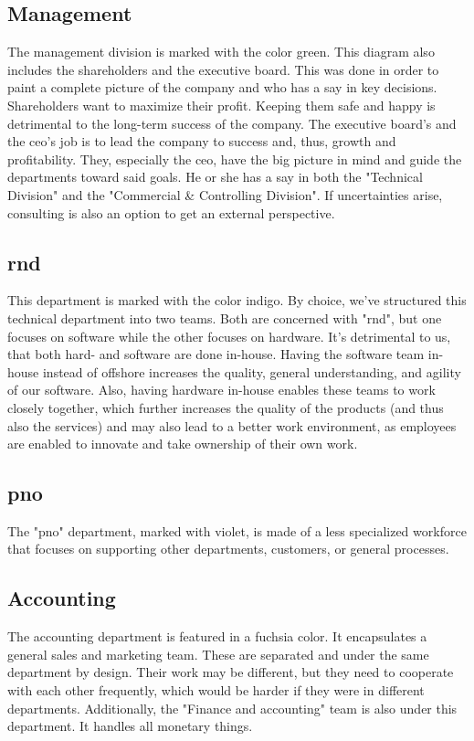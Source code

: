 \subsection{Management}\label{org-management}
The management division is marked with the color green. This diagram also includes the shareholders and the executive board. This was done in order to paint a complete picture of the company and who has a say in key decisions.
\newline
Shareholders want to maximize their profit. Keeping them safe and happy is detrimental to the long-term success of the company.
\newline
The executive board's and the \acs{ceo}'s job is to lead the company to success and, thus, growth and profitability. They, especially the \acs{ceo}, have the big picture in mind and guide the departments toward said goals. He or she has a say in both the "Technical Division" and the "Commercial \& Controlling Division".
\newline
\newline
If uncertainties arise, consulting is also an option to get an external perspective.
\subsection{\acl{rnd}}\label{org-rnd}
This department is marked with the color indigo.
\newline
By choice, we've structured this technical department into two teams. Both are concerned with "\acl{rnd}", but one focuses on software while the other focuses on hardware. It's detrimental to us, that both hard- and software are done in-house. Having the software team in-house instead of offshore increases the quality, general understanding, and agility of our software. Also, having hardware in-house enables these teams to work closely together, which further increases the quality of the products (and thus also the services) and may also lead to a better work environment, as employees are enabled to innovate and take ownership of their own work. \cite{wang_2022_employee}
\subsection{\acl{pno}}
The "\acl{pno}" department, marked with violet, is made of a less specialized workforce that focuses on supporting other departments, customers, or general processes.
\subsection{Accounting}
The accounting department is featured in a fuchsia color. It encapsulates a general sales and marketing team. These are separated and under the same department by design. Their work may be different, but they need to cooperate with each other frequently, which would be harder if they were in different departments.
Additionally, the "Finance and accounting" team is also under this department. It handles all monetary things.
